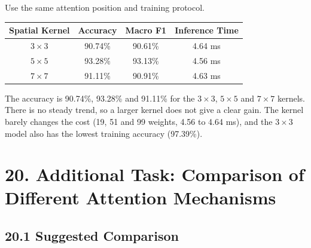 \documentclass[10pt]{article}
\begin{document}
Use the same attention position and training protocol.

\begin{center}

\begin{tabular}{|c|c|c|c|}
\hline
\textbf{Spatial Kernel} & \textbf{Accuracy} & \textbf{Macro F1} & \textbf{Inference Time} \\
\hline
$3\times3$ & 90.74\% & 90.61\% & 4.64 ms \\
\hline
$5\times5$ & 93.28\% & 93.13\% & 4.56 ms \\
\hline
$7\times7$ & 91.11\% & 90.91\% & 4.63 ms \\
\hline
\end{tabular}

\end{center}

The accuracy is 90.74\%, 93.28\% and 91.11\% for the $3\times3$, $5\times5$ and $7\times7$ kernels. There is no steady trend, so a larger kernel does not give a clear gain. The kernel barely changes the cost (19, 51 and 99 weights, 4.56 to 4.64 ms), and the $3\times3$ model also has the lowest training accuracy (97.39\%).

\section*{20. Additional Task: Comparison of Different Attention Mechanisms}

\subsection*{20.1 Suggested Comparison}
\end{document}
